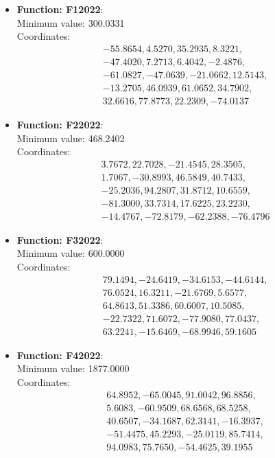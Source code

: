 \documentclass{article}
\begin{document}
\begin{itemize}
  \item \textbf{Function: F12022}: \\
    Minimum value: 300.0331 \\
    Coordinates:
    \[
      \begin{aligned}
        & -55.8654, 4.5270, 35.2935, 8.3221, \\
        & -47.4020, 7.2713, 6.4042, -2.4876, \\
        & -61.0827, -47.0639, -21.0662, 12.5143, \\
        & -13.2705, 46.0939, 61.0652, 34.7902, \\
        & 32.6616, 77.8773, 22.2309, -74.0137
      \end{aligned}
    \]

  \item \textbf{Function: F22022}: \\
    Minimum value: 468.2402 \\
    Coordinates:
    \[
      \begin{aligned}
        & 3.7672, 22.7028, -21.4545, 28.3505, \\
        & 1.7067, -30.8993, 46.5849, 40.7433, \\
        & -25.2036, 94.2807, 31.8712, 10.6559, \\
        & -81.3000, 33.7314, 17.6225, 23.2230, \\
        & -14.4767, -72.8179, -62.2388, -76.4796
      \end{aligned}
    \]

  \item \textbf{Function: F32022}: \\
    Minimum value: 600.0000 \\
    Coordinates:
    \[
      \begin{aligned}
        & 79.1494, -24.6419, -34.6153, -44.6144, \\
        & 76.0524, 16.3211, -21.6769, 5.6577, \\
        & 64.8613, 51.3386, 60.6007, 10.5085, \\
        & -22.7322, 71.6072, -77.9080, 77.0437, \\
        & 63.2241, -15.6469, -68.9946, 59.1605
      \end{aligned}
    \]

  \item \textbf{Function: F42022}: \\
    Minimum value: 1877.0000 \\
    Coordinates:
    \[
      \begin{aligned}
        & 64.8952, -65.0045, 91.0042, 96.8856, \\
        & 5.6083, -60.9509, 68.6568, 68.5258, \\
        & 40.6507, -34.1687, 62.3141, -16.3937, \\
        & -51.4475, 45.2293, -25.0119, 85.7414, \\
        & 94.0983, 75.7650, -54.4625, 39.1955
      \end{aligned}
    \]


\end{itemize}
\end{document}
